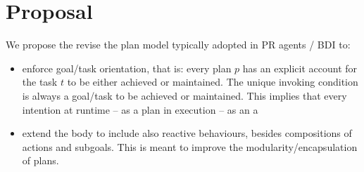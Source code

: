 \section{Proposal}

We propose the revise the plan model typically adopted in PR agents / BDI to:

\begin{itemize}

\item enforce goal/task orientation, that is:
%
every plan $p$ has an explicit account for the task $t$ to be either achieved or maintained.
%
The unique invoking condition is always a goal/task to be achieved or maintained.
%
This implies that every intention at runtime -- as a plan in execution -- as an a

\item extend the body to include also reactive behaviours, besides compositions of actions and subgoals. 
%
This is meant to improve  the modularity/encapsulation of plans.

\end{itemize}
